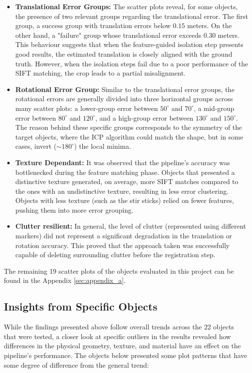 \begin{itemize}
    \item \textbf{Translational Error Groups:} The scatter plots reveal, for some objects, the presence of two relevant groups regarding the translational error. The first group, a success group with translation errors below $0.15$ meters. On the other hand, a "failure" group whose translational error exceeds $0.30$ meters. This behaviour suggests that when the feature-guided isolation step presents good results, the estimated translation is closely aligned with the ground truth. However, when the isolation steps fail due to a poor performance of the SIFT matching, the crop leads to a partial misalignment. 
    \item \textbf{Rotational Error Group:} Similar to the translational error groups, the rotational errors are generally divided into three horizontal groups across many scatter plots: a lower-group error between $50^\circ$ and $70^\circ$, a mid-group error between $80^\circ$ and $120^\circ$, and a high-group error between $130^\circ$ and $150^\circ$. The reason behind these specific groups corresponds to the symmetry of the target objects, where the ICP algorithm could match the shape, but in some cases, invert ($\sim 180^\circ$) the local minima.
    \item \textbf{Texture Dependant:} It was observed that the pipeline's accuracy was bottlenecked during the feature matching phase. Objects that presented a distinctive texture generated, on average, more SIFT matches compared to the ones with an undistinctive texture, resulting in less error clustering. Objects with less texture (such as the stir sticks) relied on fewer features, pushing them into more error grouping. 
    \item \textbf{Clutter resilient:} In general, the level of clutter (represented using different markers) did not represent a significant degradation in the translation or rotation accuracy. This proved that the approach taken was successfully capable of deleting surrounding clutter before the registration step.
\end{itemize}

The remaining 19 scatter plots of the objects evaluated in this project can be found in the Appendix
\ref{sec:appendix_a}.

\subsection{Insights from Specific Objects}
While the findings presented above follow overall trends across the 22 objects that were tested, a closer look at specific outliers in the results revealed how differences in the physical geometry, texture, and material have an effect on the pipeline's performance. The objects below presented some plot patterns that have some degree of difference from the general trend:

